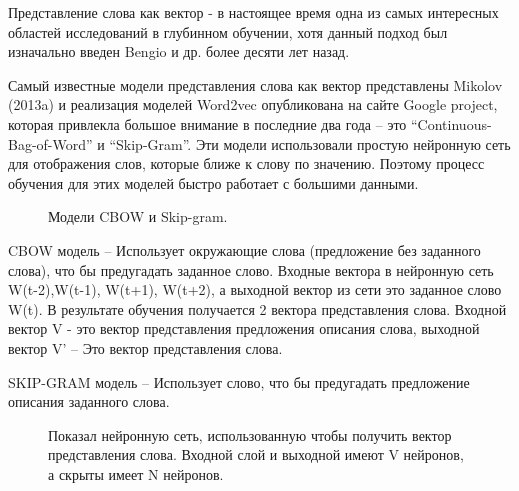 \documentclass[12pt]{article}
\begin{document}
Представление слова как вектор - в настоящее время одна из самых интересных областей исследований в глубинном обучении, хотя данный подход был изначально введен Bengio \cite{Bengio} и др. более десяти лет назад.

	Самый известные модели представления слова как вектор представлены Mikolov (2013a)\cite{Mikolov} и реализация моделей Word2vec \cite{word2vec} опубликована на сайте Google project, которая привлекла большое внимание в последние два года – это “Continuous-Bag-of-Word” и “Skip-Gram”. Эти модели использовали простую нейронную сеть для отображения слов, которые ближе к слову по значению. Поэтому процесс обучения для этих моделей быстро работает с большими данными. 
	
	\begin{figure}[H]
		\noindent{}
		\caption{Модели CBOW и Skip-gram.}
		\label{figCurves}
	\end{figure}
	
CBOW модель – Использует окружающие слова (предложение без заданного слова), что бы предугадать заданное слово. Входные вектора в нейронную сеть W(t-2),W(t-1), W(t+1), W(t+2), а выходной вектор из сети это заданное слово W(t). В результате обучения получается 2 вектора представления слова. Входной вектор V - это вектор представления предложения описания слова, выходной вектор V’ – Это вектор представления слова.

SKIP-GRAM модель – Использует слово, что бы предугадать предложение описания заданного слова.

 	\begin{figure}[H]
		\noindent{}
		\caption{Показал нейронную сеть, использованную чтобы получить вектор представления слова. Входной слой и выходной имеют V нейронов, а скрыты имеет N нейронов.}
		\label{figCurves}
	\end{figure}
\end{document}
